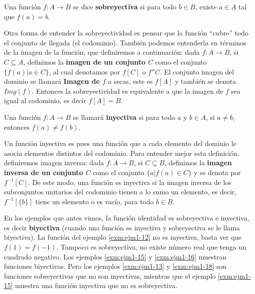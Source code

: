 \documentclass[12pt,]{krantz}
\theoremstyle{definition}
\theoremstyle{definition}
\theoremstyle{definition}
\theoremstyle{remark}
\let\BeginKnitrBlock\begin \let\EndKnitrBlock\end
\begin{document}
\BeginKnitrBlock{definition}
\protect\hypertarget{def:unnamed-chunk-29}{}{\label{def:unnamed-chunk-29}
}Una función \(f:A\longrightarrow B\) se dice \textbf{sobreyectiva} si
para todo \(b\in B\), existe \(a\in A\) tal que \(f(a)=b\).
\EndKnitrBlock{definition}

Otra forma de entender la sobreyectividad es pensar que la función
``cubre'' todo el conjunto de llegada (el codominio). También podemos
entenderla en términos de la imagen de la función, que definiremos a
continuación: dada \(f:A\longrightarrow B\), si \(C\subseteq A\),
definimos la \textbf{imagen de un conjunto \(C\)} como el conjunto
\(\{f(a) | a\in C \}\), al cual denotamos por \(f[C]\) o \(f''C\). El
conjunto imagen del dominio se llamará \textbf{Imagen de \(f\)} a secas,
este es \(f[A]\) y también se denota \(Img(f)\). Entonces la
sobreyectividad es equivalente a que la imagen de \(f\) sea igual al
codominio, es decir \(f[A]=B\).

\BeginKnitrBlock{definition}
\protect\hypertarget{def:unnamed-chunk-30}{}{\label{def:unnamed-chunk-30}
}Una función \(f:A\longrightarrow B\) se llamará \textbf{inyectiva} si
para todo \(a\mbox{ y }b\in A\), si \(a\neq b\), entonces
\(f(a)\neq f(b)\).
\EndKnitrBlock{definition}

Un función inyectiva es pues una función que a cada elemento del dominio
le asocia elementos distintos del codominio. Para entender mejor esta
definición, definiremos imagen inversa: dada \(f:A\longrightarrow B\),
si \(C\subseteq B\), definimos la \textbf{imagen inversa de un conjunto
\(C\)} como el conjunto \(\{a | f(a)\in C \}\) y se denota por
\(f^{-1}[C]\). De este modo, una función es inyectiva si la imagen
inversa de los subconjuntos unitarios del codominio tienen a lo sumo un
elemento, es decir, \(f^{-1}[\{b\}]\) tiene un elemento o es vacío, para
todo \(b\in B\).

En los ejemplos que antes vimos, la función identidad es sobreyectiva e
inyectiva, es decir \textbf{biyectiva} (cuando una función es inyectiva
y sobreyectiva se le llama biyectiva). La función del ejemplo
\ref{exm:ejm1-12} no es inyectiva, basta ver que \(f(1)=f(-1)\). Tampoco
es sobreyectiva, no existe número real que tenga un cuadrado negativo.
Los ejemplos \ref{exm:ejm1-15} y \ref{exm:ejm1-16} muestran funciones
biyectivas. Pero los ejemplos \ref{exm:ejm1-13} y \ref{exm:ejm1-18} son
funciones sobreyectivas que no son inyectivas, mientras que el ejemplo
\ref{exm:ejm1-15} muestra una función inyectiva que no es sobreyectiva.
\end{document}
